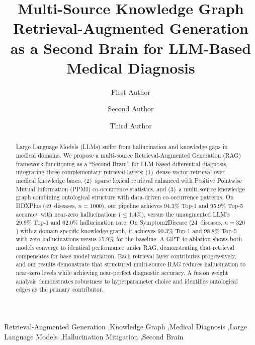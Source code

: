 \documentclass[preprint,12pt]{elsarticle}
\begin{document}
\begin{frontmatter}

\title{Multi-Source Knowledge Graph Retrieval-Augmented Generation\\as a Second Brain for LLM-Based Medical Diagnosis}

\author[addr1]{First Author}
\author[addr1]{Second Author}
\author[addr1]{Third Author}

\address[addr1]{Department of Computer Science, University, Country}

\begin{abstract}
Large Language Models (LLMs) suffer from hallucination and knowledge gaps in medical domains. We propose a multi-source Retrieval-Augmented Generation (RAG) framework functioning as a ``Second Brain'' for LLM-based differential diagnosis, integrating three complementary retrieval layers: (1)~dense vector retrieval over medical knowledge bases, (2)~sparse lexical retrieval enhanced with Positive Pointwise Mutual Information (PPMI) co-occurrence statistics, and (3)~a multi-source knowledge graph combining ontological structure with data-driven co-occurrence patterns. On DDXPlus (49~diseases, $n{=}1000$), our pipeline achieves 94.3\% Top-1 and 95.9\% Top-5 accuracy with near-zero hallucinations ($\leq 1.4$\%), versus the unaugmented LLM's 29.9\% Top-1 and 62.0\% hallucination rate. On Symptom2Disease (24~diseases, $n{=}320$) with a domain-specific knowledge graph, it achieves 90.3\% Top-1 and 98.8\% Top-5 with zero hallucinations versus 75.9\% for the baseline. A GPT-4o ablation shows both models converge to identical performance under RAG, demonstrating that retrieval compensates for base model variation. Each retrieval layer contributes progressively, and our results demonstrate that structured multi-source RAG reduces hallucination to near-zero levels while achieving near-perfect diagnostic accuracy. A fusion weight analysis demonstrates robustness to hyperparameter choice and identifies ontological edges as the primary contributor.
\end{abstract}

\begin{keyword}
Retrieval-Augmented Generation \sep Knowledge Graph \sep Medical Diagnosis \sep Large Language Models \sep Hallucination Mitigation \sep Second Brain
\end{keyword}

\end{frontmatter}

\end{document}
